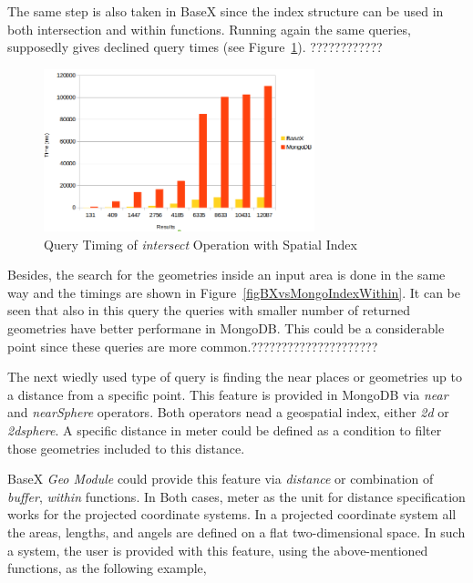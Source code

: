 \documentclass[a4paper,12pt]{article}
\begin{document}
The same step is also taken in BaseX since the index structure can be used in both intersection and within functions. Running again the same queries, supposedly gives declined query times (see Figure~\ref{figBXvsMongoIndexIntersects}). ????????????


\begin{figure}
\centering
\includegraphics[width=0.7\textwidth]{BXvsMongo-Intersects-Index}
\caption{Query Timing of \textit{intersect} Operation with Spatial Index}
\label{figBXvsMongoIndexIntersects}
\end{figure}

Besides, the search for the geometries inside an input area is done in the same way and the timings are shown in Figure~\ref{figBXvsMongoIndexWithin}. It can be seen that also in this query the queries with smaller number of returned geometries have better performane in MongoDB. This could be a considerable point since these queries are more common.?????????????????????


The next wiedly used type of query is finding the near places or geometries up to a distance from a specific point. This feature is provided in MongoDB via \textit{near} and \textit{nearSphere} operators. Both operators nead a geospatial index, either \textit{2d} or \textit{2dsphere}. A specific distance in meter could be defined as a condition to filter those geometries included to this distance. 


BaseX \textit{Geo Module} could provide this feature via \textit{distance} or combination of \textit{buffer}, \textit{within} functions. In Both cases, meter as the unit for distance specification works for the projected coordinate systems\cite{}. In a projected coordinate system all the areas, lengths, and angels are defined on a flat two-dimensional space. In such a system, the user is provided with this feature, using the above-mentioned functions, as the following example,
\end{document}
